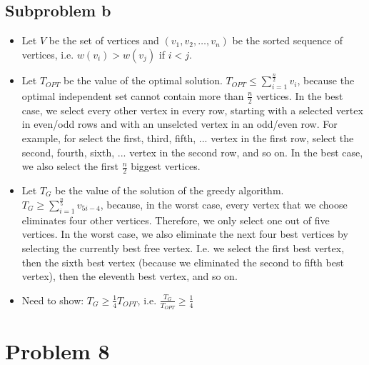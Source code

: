 \documentclass[12pt]{article}
\begin{document}
\subsection*{Subproblem b}
\begin{itemize}
	\item Let $V$ be the set of vertices and $(v_1, v_2, \ldots, v_n)$ be the sorted sequence of vertices, i.e. $w(v_i) > w(v_j)$ if $i < j$.
	\item Let $T_\mathit{OPT}$ be the value of the optimal solution. $T_\mathit{OPT} \leq \sum_{i=1}^{\frac{n}{2}} v_i$, because the optimal independent set cannot contain more than $\frac{n}{2}$ vertices. In the best case, we select every other vertex in every row, starting with a selected vertex in even/odd rows and with an unselcted vertex in an odd/even row. For example, for select the first, third, fifth, ... vertex in the first row, select the second, fourth, sixth, ... vertex in the second row, and so on. In the best case, we also select the first $\frac{n}{2}$ biggest vertices.
	\item Let $T_G$ be the value of the solution of the greedy algorithm. $T_G \geq \sum_{i=1}^{\frac{n}{5}} v_{5i - 4}$, because, in the worst case, every vertex that we choose eliminates four other vertices. Therefore, we only select one out of five vertices. In the worst case, we also eliminate the next four best vertices by selecting the currently best free vertex. I.e. we select the first best vertex, then the sixth best vertex (because we eliminated the second to fifth best vertex), then the eleventh best vertex, and so on.
	\item Need to show: $T_G \geq \frac{1}{4} T_\mathit{OPT}$, i.e. $\frac{T_G}{T_\mathit{OPT}} \geq \frac{1}{4}$
\end{itemize}

\section*{Problem 8}
\end{document}
